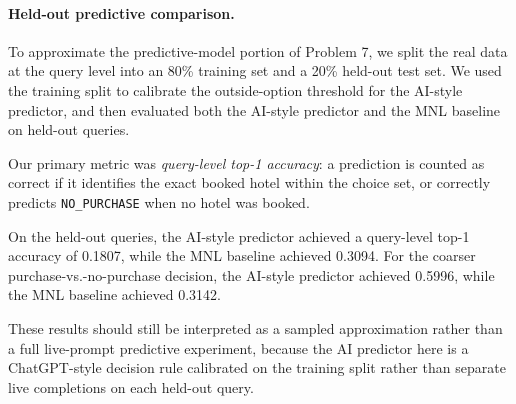 
\paragraph{Held-out predictive comparison.}
To approximate the predictive-model portion of Problem 7, we split the real data at the query level into an 80\% training set and a 20\% held-out test set. We used the training split to calibrate the outside-option threshold for the AI-style predictor, and then evaluated both the AI-style predictor and the MNL baseline on held-out queries.

Our primary metric was \emph{query-level top-1 accuracy}: a prediction is counted as correct if it identifies the exact booked hotel within the choice set, or correctly predicts \texttt{NO\_PURCHASE} when no hotel was booked.

On the held-out queries, the AI-style predictor achieved a query-level top-1 accuracy of 0.1807, while the MNL baseline achieved 0.3094. For the coarser purchase-vs.-no-purchase decision, the AI-style predictor achieved 0.5996, while the MNL baseline achieved 0.3142.

These results should still be interpreted as a sampled approximation rather than a full live-prompt predictive experiment, because the AI predictor here is a ChatGPT-style decision rule calibrated on the training split rather than separate live completions on each held-out query.
